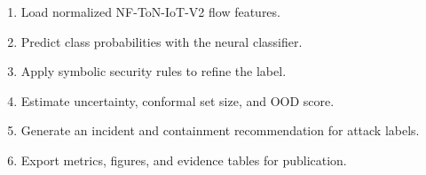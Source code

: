 \begin{enumerate}
\item Load normalized NF-ToN-IoT-V2 flow features.
\item Predict class probabilities with the neural classifier.
\item Apply symbolic security rules to refine the label.
\item Estimate uncertainty, conformal set size, and OOD score.
\item Generate an incident and containment recommendation for attack labels.
\item Export metrics, figures, and evidence tables for publication.
\end{enumerate}
